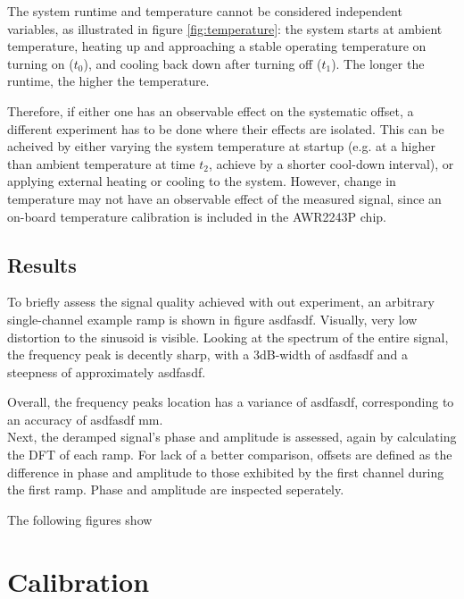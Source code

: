 The system runtime and temperature cannot be considered independent variables, as illustrated in figure \ref{fig:temperature}:
the system starts at ambient temperature, heating up and approaching a stable operating temperature on turning on ($t_0$), and cooling back down after turning off ($t_1$).
The longer the runtime, the higher the temperature.

Therefore, if either one has an observable effect on the systematic offset, a different experiment has to be done where their effects are isolated.
This can be acheived by either varying the system temperature at startup (e.g. at a higher than ambient temperature at time $t_2$, achieve by a shorter cool-down interval),
or applying external heating or cooling to the system. However, change in temperature may not have an observable effect of the measured signal,
since an on-board temperature calibration is included in the AWR2243P chip.

\subsection{Results}
To briefly assess the signal quality achieved with out experiment, an arbitrary single-channel example ramp is shown in figure asdfasdf.
Visually, very low distortion to the sinusoid is visible. Looking at the spectrum of the entire signal,
the frequency peak is decently sharp, with a 3dB-width of asdfasdf and a steepness of approximately asdfasdf.

Overall, the frequency peaks location has a variance of asdfasdf, corresponding to an accuracy of asdfasdf mm. \\

Next, the deramped signal's phase and amplitude is assessed, again by calculating the DFT of each ramp.
For lack of a better comparison, offsets are defined as the difference in phase and amplitude to those exhibited by the first channel during the first ramp.
Phase and amplitude are inspected seperately.

The following figures show
\section{Calibration}
